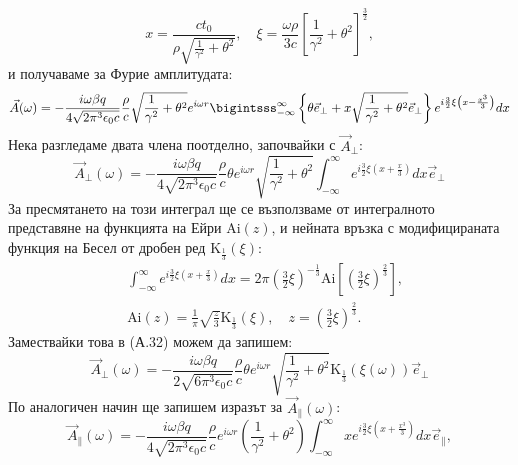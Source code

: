 \begin{appendices}
\begin{equation}
	x = \frac{ct_0}{\rho\sqrt{\frac{1}{\gamma^2} + \theta^2}},\quad \xi = \frac{\omega\rho}{3c}\left[\frac{1}{\gamma^2} + \theta^2\right]^{\frac{3}{2}},
\end{equation}
и получаваме за Фурие амплитудата:
\begin{equation}
	\vec{A}(\omega) = -\frac{i\omega\beta q}{4\sqrt{2\pi^3\epsilon_0 c}}\frac{\rho}{c}\sqrt{\frac{1}{\gamma^2}+\theta^2}e^{i\omega r}\bigintsss_{-\infty}^\infty\left\{\theta \vec{e}_\perp + x\sqrt{\frac{1}{\gamma^2} + \theta^2}\vec{e}_\perp\right\}e^{i\frac{3}{2}\xi\left(x - \frac{x^3}{3}\right)}dx
\end{equation}
Нека разгледаме двата члена поотделно, започвайки с $\vec{A}_\perp$:
\begin{equation}
	\vec{A}_\perp(\omega)=-\frac{i\omega\beta q}{4\sqrt{2\pi^3\epsilon_0 c}}\frac{\rho}{c}\theta e^{i\omega r}\sqrt{\frac{1}{\gamma^2}+\theta^2}\int_{-\infty}^\infty e^{i\frac{3}{2}\xi\left(x + \frac{x}{3}\right)}dx \vec{e}_\perp
\end{equation}
За пресмятането на този интеграл ще се възползваме от интегралното представяне на функцията на Ейри $\text{Ai}(z)$, и нейната връзка с модифицираната функция на Бесел от дробен ред $\text{K}_{\frac{1}{3}}(\xi)$:
\begin{equation}
	\begin{split}
	&\int_{-\infty}^\infty e^{i\frac{3}{2}\xi\left(x + \frac{x}{3}\right)}dx = 2\pi\left(\frac{3}{2}\xi\right)^{-\frac{1}{3}}\text{Ai}\left[\left(\frac{3}{2}\xi\right)^{\frac{2}{3}}\right],\\
	&\text{Ai}(z) = \frac{1}{\pi}\sqrt{\frac{z}{3}}\text{K}_{\frac{1}{3}}(\xi),\quad z = \left(\frac{3}{2}\xi\right)^{\frac{2}{3}}.
	\end{split}
\end{equation}
Замествайки това в (А.32) можем да запишем:
\begin{equation}
	\vec{A}_\perp(\omega) = -\frac{i\omega\beta q}{2\sqrt{6\pi^3\epsilon_0 c}}\frac{\rho}{c}\theta e^{i\omega r}\sqrt{\frac{1}{\gamma^2} + \theta^2}\text{K}_{\frac{1}{3}}(\xi(\omega))\vec{e}_\perp
\end{equation}
По аналогичен начин ще запишем изразът за $\vec{A}_\parallel(\omega)$:
\begin{equation}
	\vec{A}_\parallel(\omega) = -\frac{i\omega\beta q}{4\sqrt{2\pi^3\epsilon_0 c}}\frac{\rho}{c}e^{i\omega r}\left(\frac{1}{\gamma^2} + \theta^2\right)\int_{-\infty}^\infty x e^{i\frac{3}{2}\xi\left(x + \frac{x^3}{3}\right)}dx \vec{e}_\parallel,

\end{equation}
\end{appendices}
